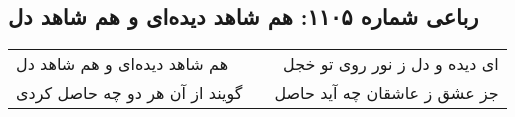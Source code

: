 \begin{center}
\section*{رباعی شماره ۱۱۰۵: هم شاهد دیده‌ای و هم شاهد دل}
\label{sec:1105}
\begin{longtable}{l p{0.5cm} r}
هم شاهد دیده‌ای و هم شاهد دل
&&
ای دیده و دل ز نور روی تو خجل
\\
گویند از آن هر دو چه حاصل کردی
&&
جز عشق ز عاشقان چه آید حاصل
\\
\end{longtable}
\end{center}
